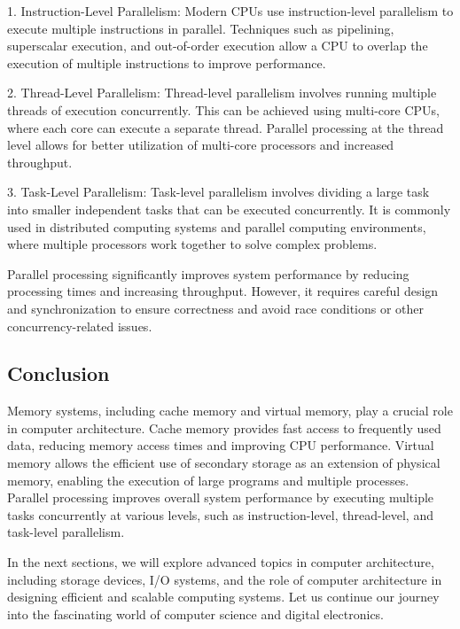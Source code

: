 \documentclass{article}
\begin{document}
1. Instruction-Level Parallelism: Modern CPUs use instruction-level parallelism to execute multiple instructions in parallel. Techniques such as pipelining, superscalar execution, and out-of-order execution allow a CPU to overlap the execution of multiple instructions to improve performance.

2. Thread-Level Parallelism: Thread-level parallelism involves running multiple threads of execution concurrently. This can be achieved using multi-core CPUs, where each core can execute a separate thread. Parallel processing at the thread level allows for better utilization of multi-core processors and increased throughput.

3. Task-Level Parallelism: Task-level parallelism involves dividing a large task into smaller independent tasks that can be executed concurrently. It is commonly used in distributed computing systems and parallel computing environments, where multiple processors work together to solve complex problems.

Parallel processing significantly improves system performance by reducing processing times and increasing throughput. However, it requires careful design and synchronization to ensure correctness and avoid race conditions or other concurrency-related issues.

\subsection{Conclusion}

Memory systems, including cache memory and virtual memory, play a crucial role in computer architecture. Cache memory provides fast access to frequently used data, reducing memory access times and improving CPU performance. Virtual memory allows the efficient use of secondary storage as an extension of physical memory, enabling the execution of large programs and multiple processes. Parallel processing improves overall system performance by executing multiple tasks concurrently at various levels, such as instruction-level, thread-level, and task-level parallelism.

In the next sections, we will explore advanced topics in computer architecture, including storage devices, I/O systems, and the role of computer architecture in designing efficient and scalable computing systems. Let us continue our journey into the fascinating world of computer science and digital electronics.

\newpage
\end{document}
